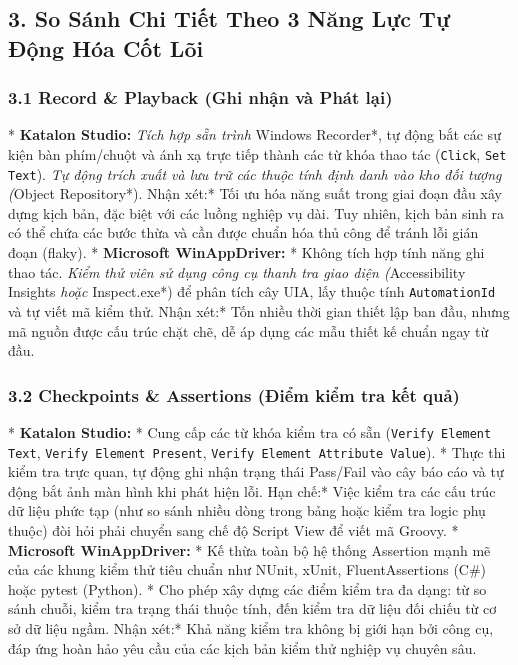 \subsection{3. So Sánh Chi Tiết Theo 3 Năng Lực Tự Động Hóa Cốt Lõi}

\subsubsection{3.1 Record \& Playback (Ghi nhận và Phát lại)}
* \textbf{Katalon Studio:}
  \textit{ Tích hợp sẵn trình }Windows Recorder*, tự động bắt các sự kiện bàn phím/chuột và ánh xạ trực tiếp thành các từ khóa thao tác (\texttt{Click}, \texttt{Set Text}).
  \textit{ Tự động trích xuất và lưu trữ các thuộc tính định danh vào kho đối tượng (}Object Repository*).
  \textit{ }Nhận xét:* Tối ưu hóa năng suất trong giai đoạn đầu xây dựng kịch bản, đặc biệt với các luồng nghiệp vụ dài. Tuy nhiên, kịch bản sinh ra có thể chứa các bước thừa và cần được chuẩn hóa thủ công để tránh lỗi gián đoạn (flaky).
* \textbf{Microsoft WinAppDriver:}
  * Không tích hợp tính năng ghi thao tác. 
  \textit{ Kiểm thử viên sử dụng công cụ thanh tra giao diện (}Accessibility Insights\textit{ hoặc }Inspect.exe*) để phân tích cây UIA, lấy thuộc tính \texttt{AutomationId} và tự viết mã kiểm thử.
  \textit{ }Nhận xét:* Tốn nhiều thời gian thiết lập ban đầu, nhưng mã nguồn được cấu trúc chặt chẽ, dễ áp dụng các mẫu thiết kế chuẩn ngay từ đầu.

\subsubsection{3.2 Checkpoints \& Assertions (Điểm kiểm tra kết quả)}
* \textbf{Katalon Studio:}
  * Cung cấp các từ khóa kiểm tra có sẵn (\texttt{Verify Element Text}, \texttt{Verify Element Present}, \texttt{Verify Element Attribute Value}).
  * Thực thi kiểm tra trực quan, tự động ghi nhận trạng thái Pass/Fail vào cây báo cáo và tự động bắt ảnh màn hình khi phát hiện lỗi.
  \textit{ }Hạn chế:* Việc kiểm tra các cấu trúc dữ liệu phức tạp (như so sánh nhiều dòng trong bảng hoặc kiểm tra logic phụ thuộc) đòi hỏi phải chuyển sang chế độ Script View để viết mã Groovy.
* \textbf{Microsoft WinAppDriver:}
  * Kế thừa toàn bộ hệ thống Assertion mạnh mẽ của các khung kiểm thử tiêu chuẩn như NUnit, xUnit, FluentAssertions (C#) hoặc pytest (Python).
  * Cho phép xây dựng các điểm kiểm tra đa dạng: từ so sánh chuỗi, kiểm tra trạng thái thuộc tính, đến kiểm tra dữ liệu đối chiếu từ cơ sở dữ liệu ngầm.
  \textit{ }Nhận xét:* Khả năng kiểm tra không bị giới hạn bởi công cụ, đáp ứng hoàn hảo yêu cầu của các kịch bản kiểm thử nghiệp vụ chuyên sâu.

